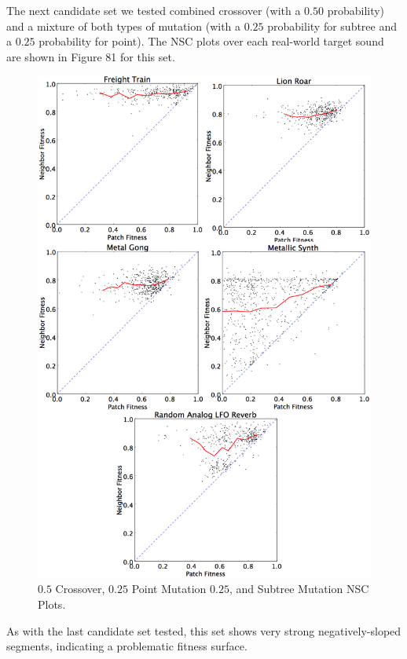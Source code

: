 \documentclass[12pt]{report} 	%
\numberwithin{figure}{chapter}
\numberwithin{table}{chapter}
\numberwithin{equation}{chapter}
\begin{document}
\begin{flushleft}
The next candidate set we tested combined crossover (with a $0.50$ probability) and a mixture of both types of mutation (with a $0.25$ probability for subtree and a $0.25$ probability for point). The NSC plots over each real-world target sound are shown in Figure 81 for this set.
\begin{figure}[h!]
\begin{center}
\includegraphics[scale=0.15]{GOPS_Param5}
\caption[$0.5$ Crossover, $0.25$ point mutation, and $0.25$ subtree mutation NSC plots]{$0.5$ Crossover, $0.25$ Point Mutation $0.25$, and Subtree Mutation NSC Plots.}
\end{center}
\end{figure}

As with the last candidate set tested, this set shows very strong negatively-sloped segments, indicating a problematic fitness surface.


\end{flushleft}
\end{document}
